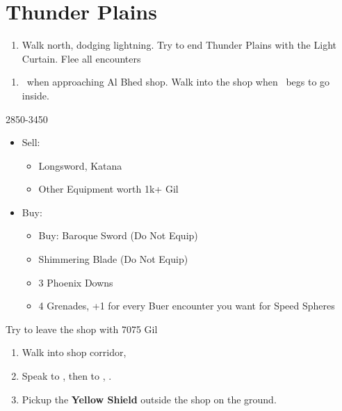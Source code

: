 \chapter{Thunder Plains}

\begin{enumerate}
  \item Walk north, dodging lightning. Try to end Thunder Plains with the Light Curtain. Flee all encounters
\end{enumerate}
\begin{enumerate}[resume]
  \item \sd\ when approaching Al Bhed shop. Walk into the shop when \rikku\ begs to go inside.
\end{enumerate}
\begin{shop}{2850-3450}
  \begin{itemize}
    \item Sell: 
          \begin{itemize}
            \item Longsword, Katana
            \item Other Equipment worth 1k+ Gil
          \end{itemize}
    \item Buy:
          \begin{itemize}
            \item Buy: Baroque Sword (Do Not Equip)
            \item Shimmering Blade (Do Not Equip)
            \item 3 Phoenix Downs
            \item 4 Grenades, +1 for every Buer encounter you want for Speed Spheres
          \end{itemize}
  \end{itemize}
Try to leave the shop with 7075 Gil
\end{shop}
\begin{enumerate}[resume]
  \item Walk into shop corridor, \cs[2:00]
  \item Speak to \auron, then to \rikku, \sd.
  \item Pickup the \textbf{Yellow Shield} outside the shop on the ground.
  \end{enumerate}
  
